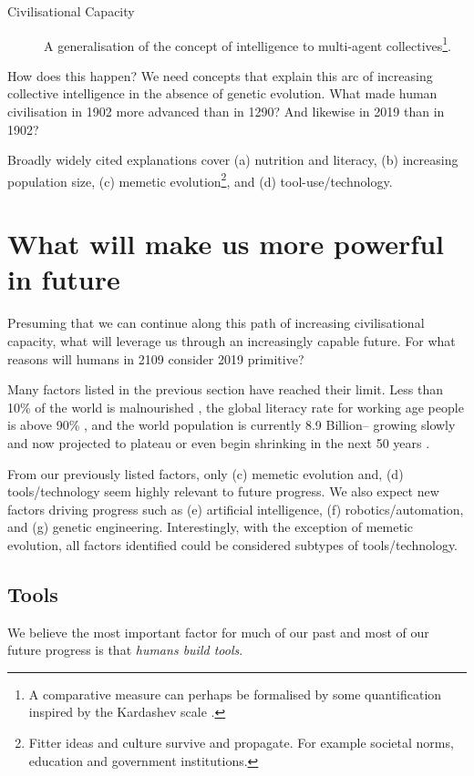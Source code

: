 \documentclass[logo,bsc,singlespacing,parskip]{infthesis}
\begin{document}
\begin{mdframed}
\begin{description}
\item[{Civilisational Capacity\label{Civilisational Capacity}}] A generalisation of the concept of intelligence to multi-agent collectives\footnote{A comparative measure can perhaps be formalised by some quantification inspired by the Kardashev scale \autocite{kardashevTransmissionInformationExtraterrestrial1964}.}.
\end{description}
\end{mdframed}

How does this happen?
We need concepts that explain this arc of increasing collective intelligence in the absence of genetic evolution.
What made human civilisation in 1902 more advanced than in 1290?
And likewise in 2019 than in 1902?

Broadly widely cited explanations cover (a) nutrition and literacy, (b) increasing population size, (c) memetic evolution\footnote{Fitter ideas and culture survive and propagate. For example societal norms, education and government institutions.}, and (d) tool-use/technology.

\section{What will make us more powerful in future}
\label{sec:org4f1b7fc}
Presuming that we can continue along this path of increasing civilisational capacity, what will leverage us through an increasingly capable future.
For what reasons will humans in 2109 consider 2019 primitive?

Many factors listed in the previous section have reached their limit.
Less than 10\% of the world is malnourished \autocite{OurWorldData}, the global literacy rate for working age people is above 90\% \autocite{OurWorldData}, and the world population is currently 8.9 Billion-- growing slowly and now projected to plateau or even begin shrinking in the next 50 years \autocite{OurWorldData}.

From our previously listed factors, only (c) memetic evolution and, (d) tools/technology seem highly relevant to future progress.
We also expect new factors driving progress such as (e) artificial intelligence, (f) robotics/automation, and (g) genetic engineering.
Interestingly, with the exception of memetic evolution, all factors identified could be considered subtypes of tools/technology.

\subsection{Tools}
\label{sec:orgca8eb18}
We believe the most important factor for much of our past and most of our future progress is that \emph{humans build tools}.
\end{document}
